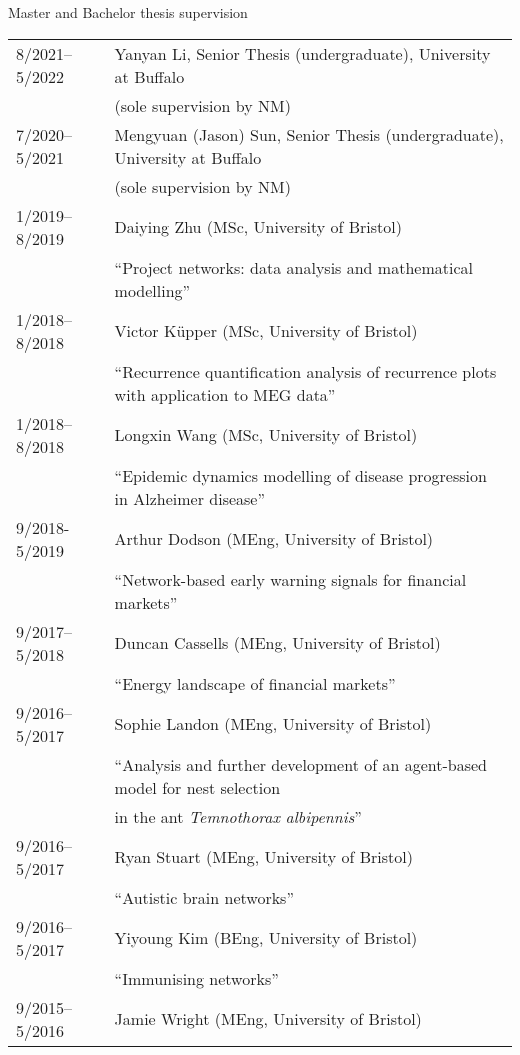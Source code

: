 \documentclass[11pt,letter]{article}
\renewenvironment{itemize}{
  \begin{list}{}{
    \setlength{\leftmargin}{1.5em}
    \setlength{\itemsep}{0.25em}
    \setlength{\parskip}{0pt}
    \setlength{\parsep}{0.25em}
  }
}{
  \end{list}
}
\begin{document}
\begin{itemize}
\smallskip

\bigskip

\item Master and Bachelor thesis supervision

\begin{tabular}{ll}
8/2021--5/2022 & Yanyan Li, Senior Thesis (undergraduate), University at Buffalo\\
& (sole supervision by NM)\\[1.5mm]
%
%
%
7/2020--5/2021 & Mengyuan (Jason) Sun, Senior Thesis (undergraduate), University at Buffalo\\
& (sole supervision by NM)\\[1.5mm]
%
1/2019--8/2019 & Daiying Zhu (MSc, University of Bristol)\\
& ``Project networks: data analysis and mathematical modelling''\\[1.5mm]
%
1/2018--8/2018 & Victor K\"{u}pper (MSc, University of Bristol)\\
& ``Recurrence quantification analysis of recurrence plots with application to MEG data''\\[1.5mm]
%
1/2018--8/2018 & Longxin Wang (MSc, University of Bristol)\\
& ``Epidemic dynamics modelling of disease progression in Alzheimer disease''\\[1.5mm]
%
9/2018-5/2019 & Arthur Dodson (MEng, University of Bristol)\\ %
& ``Network-based early warning signals for financial markets''\\[1.5mm]
%
9/2017--5/2018 & Duncan Cassells (MEng, University of Bristol)\\ %
& ``Energy landscape of financial markets''\\[1.5mm]
%
9/2016--5/2017 & Sophie Landon (MEng, University of Bristol)\\ %
& ``Analysis and further development of an agent-based model for nest selection\\
& in the ant \textit{Temnothorax albipennis}''\\[1.5mm]
%
9/2016--5/2017 & Ryan Stuart (MEng, University of Bristol)\\ %
& ``Autistic brain networks''\\[1.5mm]
%
9/2016--5/2017 & Yiyoung Kim (BEng, University of Bristol)\\ %
& ``Immunising networks''\\[1.5mm]
%
9/2015--5/2016 & Jamie Wright (MEng, University of Bristol)\\ %

\end{tabular}
\end{itemize}
\end{document}
